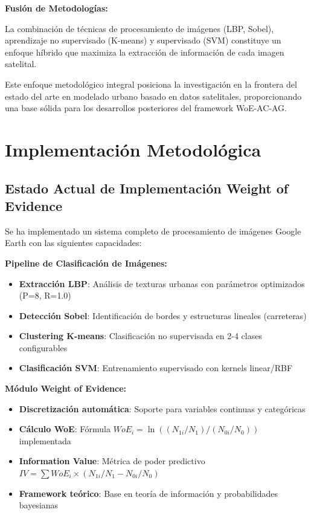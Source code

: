 \documentclass[12pt,letterpaper]{article}
\begin{document}
\textbf{Fusión de Metodologías:}

La combinación de técnicas de procesamiento de imágenes (LBP, Sobel), aprendizaje no supervisado (K-means) y supervisado (SVM) constituye un enfoque híbrido que maximiza la extracción de información de cada imagen satelital.

Este enfoque metodológico integral posiciona la investigación en la frontera del estado del arte en modelado urbano basado en datos satelitales, proporcionando una base sólida para los desarrollos posteriores del framework WoE-AC-AG.



\section{Implementación Metodológica}

\subsection{Estado Actual de Implementación Weight of Evidence}

Se ha implementado un sistema completo de procesamiento de imágenes Google Earth con las siguientes capacidades:

\textbf{Pipeline de Clasificación de Imágenes:}
\begin{itemize}
\item \textbf{Extracción LBP}: Análisis de texturas urbanas con parámetros optimizados (P=8, R=1.0)
\item \textbf{Detección Sobel}: Identificación de bordes y estructuras lineales (carreteras)
\item \textbf{Clustering K-means}: Clasificación no supervisada en 2-4 clases configurables
\item \textbf{Clasificación SVM}: Entrenamiento supervisado con kernels linear/RBF
\end{itemize}

\textbf{Módulo Weight of Evidence:}
\begin{itemize}
\item \textbf{Discretización automática}: Soporte para variables continuas y categóricas
\item \textbf{Cálculo WoE}: Fórmula $WoE_i = \ln((N_{1i}/N_1) / (N_{0i}/N_0))$ implementada
\item \textbf{Information Value}: Métrica de poder predictivo $IV = \sum WoE_i \times (N_{1i}/N_1 - N_{0i}/N_0)$
\item \textbf{Framework teórico}: Base en teoría de información y probabilidades bayesianas
\end{itemize}
\end{document}
